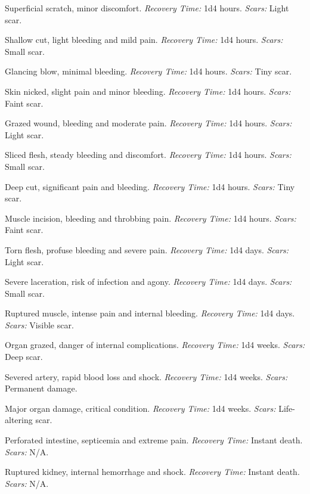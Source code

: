 \documentclass[12pt]{book}  %
\begin{document}
\begin{description}[labelwidth=1.5em, leftmargin=*, itemsep=0.4em]
    \item[1 -] Superficial scratch, minor discomfort. \textit{Recovery Time:} 1d4 hours. \textit{Scars:} Light scar.
    \item[2 -] Shallow cut, light bleeding and mild pain. \textit{Recovery Time:} 1d4 hours. \textit{Scars:} Small scar.
    \item[3 -] Glancing blow, minimal bleeding. \textit{Recovery Time:} 1d4 hours. \textit{Scars:} Tiny scar.
    \item[4 -] Skin nicked, slight pain and minor bleeding. \textit{Recovery Time:} 1d4 hours. \textit{Scars:} Faint scar.
    \item[5 -] Grazed wound, bleeding and moderate pain. \textit{Recovery Time:} 1d4 hours. \textit{Scars:} Light scar.
    \item[6 -] Sliced flesh, steady bleeding and discomfort. \textit{Recovery Time:} 1d4 hours. \textit{Scars:} Small scar.
    \item[7 -] Deep cut, significant pain and bleeding. \textit{Recovery Time:} 1d4 hours. \textit{Scars:} Tiny scar.
    \item[8 -] Muscle incision, bleeding and throbbing pain. \textit{Recovery Time:} 1d4 hours. \textit{Scars:} Faint scar.
    \item[9 -] Torn flesh, profuse bleeding and severe pain. \textit{Recovery Time:} 1d4 days. \textit{Scars:} Light scar.
    \item[10 -] Severe laceration, risk of infection and agony. \textit{Recovery Time:} 1d4 days. \textit{Scars:} Small scar.
    \item[11 -] Ruptured muscle, intense pain and internal bleeding. \textit{Recovery Time:} 1d4 days. \textit{Scars:} Visible scar.
    \item[12 -] Organ grazed, danger of internal complications. \textit{Recovery Time:} 1d4 weeks. \textit{Scars:} Deep scar.
    \item[13 -] Severed artery, rapid blood loss and shock. \textit{Recovery Time:} 1d4 weeks. \textit{Scars:} Permanent damage.
    \item[14 -] Major organ damage, critical condition. \textit{Recovery Time:} 1d4 weeks. \textit{Scars:} Life-altering scar.
    \item[15 -] Perforated intestine, septicemia and extreme pain. \textit{Recovery Time:} Instant death. \textit{Scars:} N/A.
    \item[16 -] Ruptured kidney, internal hemorrhage and shock. \textit{Recovery Time:} Instant death. \textit{Scars:} N/A.

\end{description}
\end{document}
